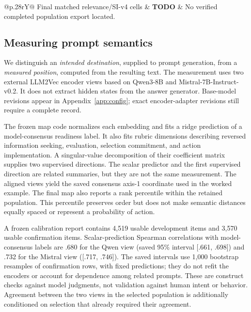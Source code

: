 \begin{table}[t]
\begin{tabularx}{\textwidth}{@{}p{}rY@{}}
Final matched relevance/SI-v4 cells & \textbf{TODO} & No verified completed population export located.\\
\bottomrule
\end{tabularx}
\caption{Design and evidence counts. Prompt counts come from direct final-file checks; execution counts describe the publication audit at 2026-10-01 05:26:47 UTC, not live cluster state. Completed registry entries do not establish answer quality, usable rankings, or valid support judgments. The three historical evidence conditions are retained strata, not separate research questions. Per-model/engine/strategy completion and analysis-eligibility denominators remain to be verified.}
\label{tab:counts}
\end{table}

\subsection{Measuring prompt semantics}
\label{sec:semantics}
We distinguish an \emph{intended destination}, supplied to prompt generation, from a \emph{measured position}, computed from the resulting text. The measurement uses two external LLM2Vec encoder views based on Qwen3-8B and Mistral-7B-Instruct-v0.2. It does not extract hidden states from the answer generator. Base-model revisions appear in Appendix~\ref{app:config}; exact encoder-adapter revisions still require a complete record.

The frozen map code normalizes each embedding and fits a ridge prediction of a model-consensus readiness label. It also fits rubric dimensions describing reversed information seeking, evaluation, selection commitment, and action implementation. A singular-value decomposition of their coefficient matrix supplies two supervised directions. The scalar predictor and the first supervised direction are related summaries, but they are not the same measurement. The aligned views yield the saved consensus axis-1 coordinate used in the worked example. The final map also reports a rank percentile within the retained population. This percentile preserves order but does not make semantic distances equally spaced or represent a probability of action.

A frozen calibration report contains 4,519 usable development items and 3,570 usable confirmation items. Scalar-prediction Spearman correlations with model-consensus labels are .680 for the Qwen view (saved 95\% interval [.661, .698]) and .732 for the Mistral view ([.717, .746]). The saved intervals use 1,000 bootstrap resamples of confirmation rows, with fixed predictions; they do not refit the encoders or account for dependence among related prompts. These are construct checks against model judgments, not validation against human intent or behavior.  Agreement between the two views in the selected population is additionally conditioned on selection that already required their agreement.

